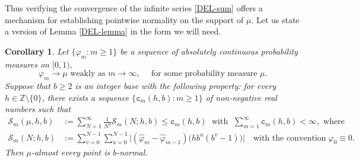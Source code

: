 \documentclass[12pt, twoside]{article}
\newtheorem{corollary}[theorem]{Corollary}
\theoremstyle{definition}
\numberwithin{equation}{section}
\begin{document}
\noindent Thus verifying the convergence of the infinite series \eqref{DEL-sum} offers a mechanism for establishing pointwise normality on the support of $\mu$. Let us state a version of Lemma \ref{DEL-lemma} in the form we will need.  
\begin{corollary} \label{DEL-corollary} 
Let $\{\varphi_m : m \geq 1\}$ be a sequence of absolutely continuous probability measures on $[0, 1)$, 
\begin{equation} \label{nu-weak-convergence} 
\varphi_m \rightarrow \mu \text{ weakly as } m \rightarrow \infty, \quad \text{ for some probability measure $\mu$. }  
\end{equation}  Suppose that $b \geq 2$ is an integer base with the following property: for every $h \in \mathbb Z \setminus \{0\}$, 
 there exists a sequence $\{\mathtt c_m(h, b) : m \geq 1\}$ of non-negative real numbers such that  
\begin{align}
\mathcal S_m(\mu, h, b) &:= \sum_{N=1}^{\infty} \frac{1}{N^{3}} \mathscr{S}_m(N;  h, b) \leq \mathtt c_m(h,b) \; \text{ with } \; \sum_{m=1}^{\infty} \mathtt c_m(h, b) < \infty,  \text{ where } \label{Sm-summable} \\
\mathscr{S}_m(N; h, b) &:= \sum_{v = 0}^{N-1} \sum_{u = 0}^{N-1} \bigl|(\widehat{\varphi}_{m} - \widehat{\varphi}_{m-1})\bigl(h b^u(b^v-1) \bigr) \bigr| \quad \text{with the convention}\; \varphi_0 \equiv 0. \label{def-Sm}
\end{align} 
Then $\mu$-almost every point is $b$-normal. 
\end{corollary} 
\end{document}
